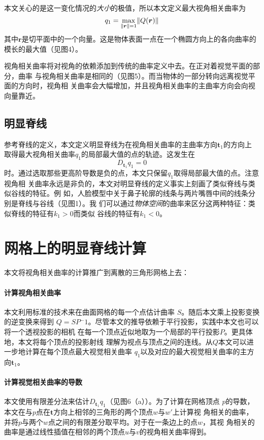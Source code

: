 \documentclass[10pt,a4paper]{article}
\theoremstyle{mythm}%
\numberwithin{equation}{section}
\DeclarePairedDelimiter\norm{\lVert}{\rVert}%
\begin{document}
\begin{CJK*}{UTF8}{wqyzh}
本文关心的是这一变化情况的\emph{大小}的极值，所以本文定义最大视角相关曲率为
\begin{equation}
    q_1=\max_{\norm{\bm{r}}=1}\norm{Q(\bm{r})}
\end{equation}
其中$\bm{r}$是切平面中的一个向量。这是物体表面一点在一个椭圆方向上的各向曲率的
模长的最大值（见图4）。

视角相关曲率将对视角的依赖添加到传统的曲率定义中去。在正对着视觉平面的部分，曲率
与视角相关曲率是相同的（见图5）。而当物体的一部分转向远离视觉平面的方向时，视角相
关曲率会大幅增加，并且视角相关曲率的主曲率方向会向视向量靠近。

\subsection{明显脊线}

参考脊线的定义，本文定义明显脊线为在视角相关曲率的主曲率方向$\bm{t}_1$的方向上
取得最大视角相关曲率$q_1$的局部最大值的点的轨迹。这发生在
\begin{equation}
    D_{\bm{t}_1}q_1=0
\end{equation}
时。通过选取那些更高阶导数是负的点，本文只保留$q_1$取得局部最大值的点。注意视角相
关曲率永远是非负的，本文对明显脊线的定义事实上刻画了类似脊线与类似谷线的特征。例
如，人脸模型中关于鼻子轮廓的线条与两片嘴唇中间的线条分别是脊线与谷线（见图1）。我
们可以通过\emph{物体空间}的曲率来区分这两种特征：类似脊线的特征有$k_1>0$而类似
谷线的特征有$k_1<0$。


\section{网格上的明显脊线计算}

本文将视角相关曲率的计算推广到离散的三角形网格上去：

\paragraph*{计算视角相关曲率}
本文利用标准的技术来在曲面网格的每一个点估计曲率
$S$\cite{Rusinkiewicz:2004:ECD}。随后本文乘上投影变换的逆变换来得到
$Q=SP{^-1}$。尽管本文的推导依赖于平行投影，实践中本文也可以将一个透视投影的相机
在每一个顶点近似地取为一个局部的平行投影$P$。更具体地，本文将每个顶点的投影射线
理解为视点与顶点之间的连线。从$Q$本文可以进一步地计算在每个顶点最大视觉相关曲率
$q_1$以及对应的最大视觉相关曲率的主方向$\bm{t}_1$。

\paragraph*{计算视觉相关曲率的导数}
本文使用有限差分法来估计$D_{\bm{t}_1}q_1$（见图6（a））。为了计算在网格顶点
$p$的导数，本文在与$p$点在$\bm{t}$方向上相邻的三角形的两个顶点$w$与$w'$上计算视
角相关的曲率，并将$p$与两个$w$点之间的有限差分取平均。对于在一条边上的点$w$，其视
角相关的曲率是通过线性插值在相邻的两个顶点$u$与$v$的视角相关曲率得到。


\end{CJK*}
\end{document}
